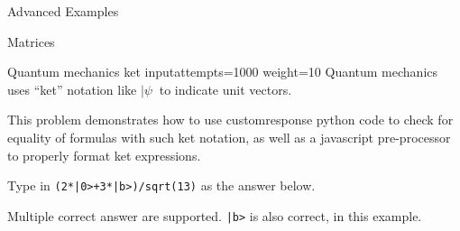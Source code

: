 \begin{edXchapter}{Advanced Examples}
\begin{edXsection}{Matrices}
\begin{edXvertical}
\begin{edXproblem}{Quantum mechanics ket input}{attempts=1000 weight=10}
Quantum mechanics uses ``ket'' notation like $|\psi\>$ to indicate unit
vectors.

This problem demonstrates how to use customresponse python code to
check for equality of formulas with such ket notation, as well as a
javascript pre-processor to properly format ket expressions.

Type in {\tt (2*|0>+3*|b>)/sqrt(13)} as the answer below.

Multiple correct answer are supported.  {\tt |b>} is also correct, in
this example.


\edXbr

%
%
%
%
% 
% 


%
%
%

\edXinline{$|\lambda\> = $ }
%


\end{edXproblem}
\end{edXvertical}
\end{edXsection}
\end{edXchapter}
